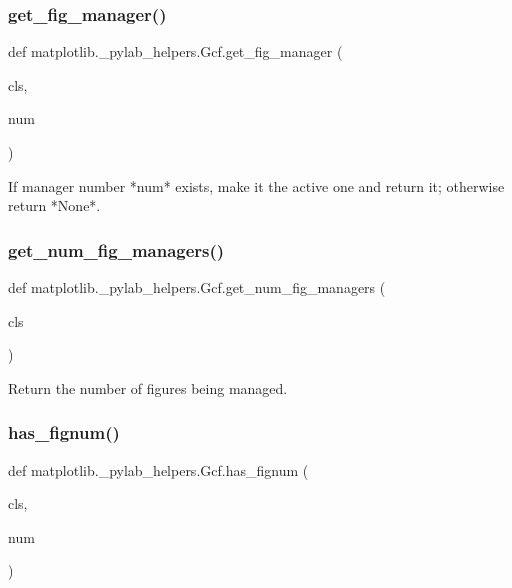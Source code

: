 \subsubsection{\texorpdfstring{get\+\_\+fig\+\_\+manager()}{get\_fig\_manager()}}
{\footnotesize\ttfamily def matplotlib.\+\_\+pylab\+\_\+helpers.\+Gcf.\+get\+\_\+fig\+\_\+manager (\begin{DoxyParamCaption}\item[{}]{cls,  }\item[{}]{num }\end{DoxyParamCaption})}

\begin{DoxyVerb}If manager number *num* exists, make it the active one and return it;
otherwise return *None*.
\end{DoxyVerb}
 \mbox{\label{classmatplotlib_1_1__pylab__helpers_1_1Gcf_adbf95150f1ec9e1e7e627c15d6e70d8f}} 
\subsubsection{\texorpdfstring{get\+\_\+num\+\_\+fig\+\_\+managers()}{get\_num\_fig\_managers()}}
{\footnotesize\ttfamily def matplotlib.\+\_\+pylab\+\_\+helpers.\+Gcf.\+get\+\_\+num\+\_\+fig\+\_\+managers (\begin{DoxyParamCaption}\item[{}]{cls }\end{DoxyParamCaption})}

\begin{DoxyVerb}Return the number of figures being managed.\end{DoxyVerb}
 \mbox{\label{classmatplotlib_1_1__pylab__helpers_1_1Gcf_a83e22aaf970c30ceace612df6d71627d}} 
\subsubsection{\texorpdfstring{has\+\_\+fignum()}{has\_fignum()}}
{\footnotesize\ttfamily def matplotlib.\+\_\+pylab\+\_\+helpers.\+Gcf.\+has\+\_\+fignum (\begin{DoxyParamCaption}\item[{}]{cls,  }\item[{}]{num }\end{DoxyParamCaption})}

